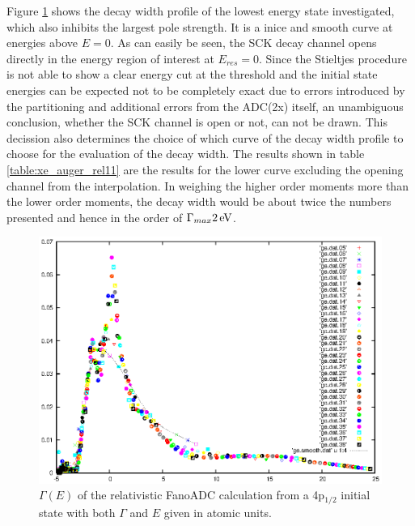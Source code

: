 Figure \ref{figure:Xe4p11_Gamma_profile} shows the decay width profile
of the lowest energy state investigated, which also inhibits the largest
pole strength. It is a inice and smooth curve at energies above $E=0$.
As can easily be seen, the \ac{SCK} decay channel opens directly
in the energy region of interest at $E_{res}=0$. Since the Stieltjes procedure
is not able to show a clear energy cut at the threshold and the initial state
energies can be expected not to be completely exact due to errors introduced
by the partitioning and additional errors from the ADC(2x) itself, an
unambiguous conclusion, whether the \ac{SCK} channel is open or not, can not be drawn.
This decission also determines the choice of which curve of the decay width
profile to choose for the evaluation of the decay width. The results shown
in table \ref{table:xe_auger_rel11} are the results for the lower curve excluding
the opening channel from the interpolation. In weighing the higher order moments
more than the lower order moments, the decay width would be about twice the numbers
presented and hence in the order of $\Gamma_{max}\unit[2]{eV}$.

\begin{figure}[h]
  \centering
  \includegraphics[scale=1.0]{pics/Xe4p_11_gammae.eps}
  \caption{$\Gamma(E)$ of the relativistic FanoADC calculation from a 4p$_{1/2}$
           initial state with both $\Gamma$ and $E$ given in atomic units.
           }
  \label{figure:Xe4p11_Gamma_profile}
\end{figure}



